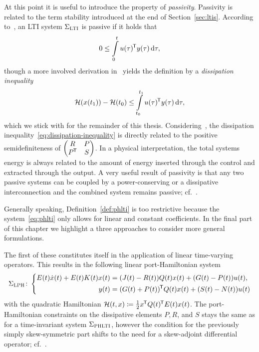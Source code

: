 At this point it is useful to introduce the property of \emph{passivity}.
Passivity is related to the term stability introduced at the end of Section~\ref{sec:ltis}.
According to~\cite[Section~3.1.2]{Benner2017}, an LTI system $\Sigma_\textsc{LTI}$ is passive if it holds that
\begin{equation*}
    0 \leq \int\limits_0^t u(\tau)^{\mkern-1.5mu \mathsf{T}} y(\tau) \mathop{}\!\mathrm{d} \tau,
\end{equation*}
though a more involved derivation in~\cite[Section~3.4]{Mehrmann2022} yields the definition by a \emph{dissipation inequality}
\begin{equation}\label{eq:dissipation-inequality}
    \mathcal{H}(x(t_1)) - \mathcal{H}(t_0) \leq \int\limits_{t_0}^{t_1} u(\tau)^{\mkern-1.5mu \mathsf{T}} y(\tau) \mathop{}\!\mathrm{d} \tau,
\end{equation}
which we stick with for the remainder of this thesis.
Considering~\cite[Theorem~6.1]{Mehrmann2022}, the dissipation inequality~\eqref{eq:dissipation-inequality} is directly related to the positive semidefiniteness of $\begin{pmatrix}
    R & P \\
    P^{\mkern-1.5mu \mathsf{T}} & S
\end{pmatrix}$.
In a physical interpretation, the total systems energy is always related to the amount of energy inserted through the control and extracted through the output.
A very useful result of passivity is that any two passive systems can be coupled by a power-conserving or a dissipative interconnection and the combined system remains passive; cf.~\cite{Mehrmann2022, Morandin2022}.


Generally speaking, Definition~\ref{def:phlti} is too restrictive because the system~\eqref{eq:phlti} only allows for linear and constant coefficients.
In the final part of this chapter we highlight a three approaches to consider more general formulations.

The first of these constitutes itself in the application of linear time-varying operators.
This results in the following linear port-Hamiltonian system
\begin{equation}\label{eq:lph}
    \Sigma_{\textsc{LPH}} \colon \left\lbrace
    \begin{aligned}
        E(t) \dot{x}(t) + E(t) K(t) x(t) &= (J(t) - R(t)) Q(t) x(t) + (G(t) - P(t)) u(t), \\
        y(t) &= (G(t) + P(t))^{\mkern-1.5mu \mathsf{T}} Q(t) x(t) + (S(t) - N(t)) u(t)
    \end{aligned}
    \right.
\end{equation}
with the quadratic Hamiltonian $\mathcal{H}(t, x) \coloneqq \frac{1}{2} x^{\mkern-1.5mu \mathsf{T}} Q(t)^{\mkern-1.5mu \mathsf{T}} E(t) x(t)$.
The port-Hamiltonian constraints on the dissipative elements $P, R$, and $S$ stays the same as for a time-invariant system $\Sigma_{\textsc{PHLTI}}$, however the condition for the previously simply skew-symmetric part shifts to the need for a skew-adjoint differential operator; cf.~\cite[Definition~4.8]{Mehrmann2022}.

